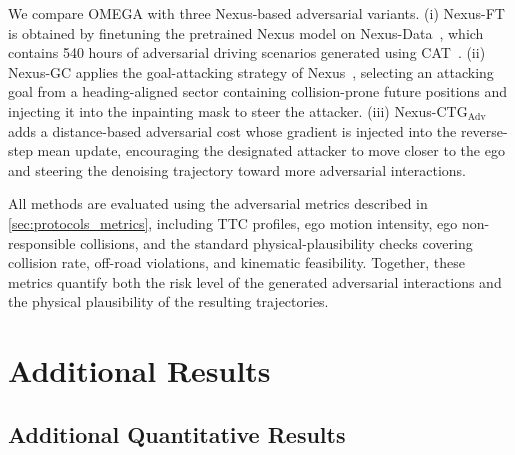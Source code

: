 \documentclass[10pt,twocolumn,letterpaper]{article}
\theoremstyle{plain}
\theoremstyle{remark}
\begin{document}
We compare OMEGA with three Nexus-based adversarial variants.
(i) Nexus-FT is obtained by finetuning the pretrained Nexus model
on Nexus-Data~\cite{zhou2025decoupled}, which contains 540 hours of adversarial driving
scenarios generated using CAT~\cite{zhang2023cat}.
(ii) Nexus-GC applies the goal-attacking strategy of
Nexus~\cite{zhou2025decoupled}, selecting an attacking goal from a heading-aligned sector containing collision-prone future
positions and injecting it into the inpainting mask to steer the
attacker. (iii) Nexus-CTG$_\mathrm{Adv}$~\cite{zhong2022guided} adds a distance-based adversarial cost whose gradient is injected into the reverse-step mean update, encouraging the designated attacker to move closer to the ego and steering the denoising trajectory toward more adversarial interactions.


All methods are evaluated using the adversarial metrics described in \cref{sec:protocols_metrics}, including TTC profiles, ego motion intensity, ego non-responsible collisions, and the standard physical-plausibility checks covering collision rate, off-road violations, and kinematic feasibility. Together, these metrics quantify both the risk level of the generated adversarial interactions and the physical plausibility of the resulting trajectories.


\section{Additional Results}

\subsection{Additional Quantitative Results}
\end{document}
